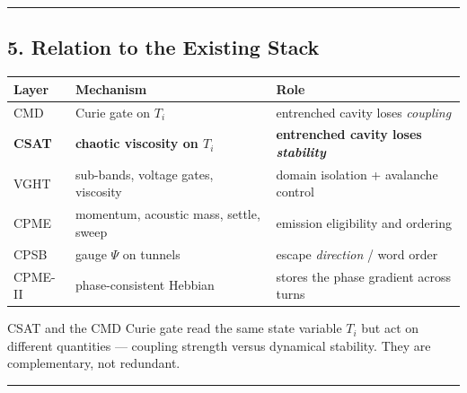 \documentclass[
  11pt,
  a4paper,
]{article}
\begin{document}
\begin{center}\rule{0.5\linewidth}{0.5pt}\end{center}

\subsection{5. Relation to the Existing
Stack}\label{relation-to-the-existing-stack}

\begin{longtable}[]{@{}
  >{\raggedright\arraybackslash}p{}
  >{\raggedright\arraybackslash}p{}
  >{\raggedright\arraybackslash}p{}@{}}
\toprule\noalign{}
\begin{minipage}[b]{\linewidth}\raggedright
Layer
\end{minipage} & \begin{minipage}[b]{\linewidth}\raggedright
Mechanism
\end{minipage} & \begin{minipage}[b]{\linewidth}\raggedright
Role
\end{minipage} \\
\midrule\noalign{}
\endhead
\bottomrule\noalign{}
\endlastfoot
CMD & Curie gate on \(T_i\) & entrenched cavity loses \emph{coupling} \\
\textbf{CSAT} & \textbf{chaotic viscosity on \(T_i\)} &
\textbf{entrenched cavity loses \emph{stability}} \\
VGHT & sub-bands, voltage gates, viscosity & domain isolation +
avalanche control \\
CPME & momentum, acoustic mass, settle, sweep & emission eligibility and
ordering \\
CPSB & gauge \(\Psi\) on tunnels & escape \emph{direction} / word
order \\
CPME-II & phase-consistent Hebbian & stores the phase gradient across
turns \\
\end{longtable}

CSAT and the CMD Curie gate read the same state variable \(T_i\) but act
on different quantities --- coupling strength versus dynamical
stability. They are complementary, not redundant.

\begin{center}\rule{0.5\linewidth}{0.5pt}\end{center}
\end{document}
